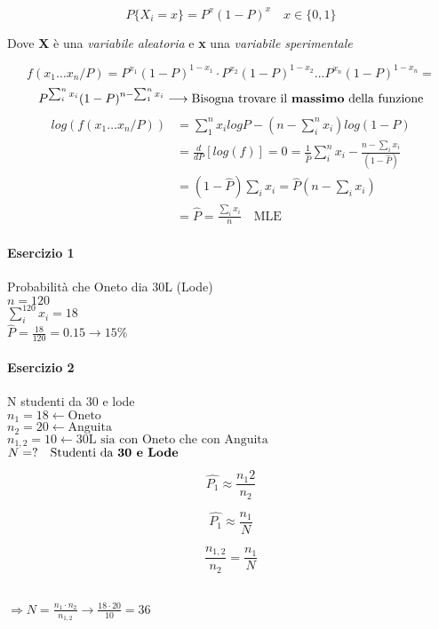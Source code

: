 \documentclass[]{article}
\begin{document}
    \[ P\{X_i = x\} = P^x (1-P)^x \quad x \in \{0, 1\} \]
    \centerline{Dove \textbf{X} è una \textit{variabile aleatoria} e \textbf{x} una \textit{variabile sperimentale} }
    \[ f(x_1 \ldots x_n / P) = P^{x_1} (1-P)^{1-x_1} \cdot P^{x_2} (1-P)^{1-x_2} \ldots P^{x_n} (1-P)^{1-x_n} = \]
    \[ P^{\sum_{i}^{n}x_i} (1-P)^{n - \sum_{1}^{n} x_i} \longrightarrow \text{Bisogna trovare il \textbf{massimo} della funzione} \]
    \begin{equation*}
        \begin{split}
            log(f(x_1 \ldots x_n / P)) &= \sum_{1}^{n} x_i log P - (n - \sum_{i}^{n} x_i) log(1-P) \\
            &= \frac{d}{dP}[log(f)] = 0 = \frac{1}{\hat{P}} \sum_{i}^{n} x_i - \frac{n - \sum_{i}^{} x_i }{(1-\hat{P})} \\
            &= (1- \hat{P}) \sum_{i}^{} x_i = \hat{P} (n - \sum_{i}^{} x_i) \\
            &= \hat{P} = \frac{\sum_{i}^{} x_i }{n} \quad \text{MLE}
        \end{split}
    \end{equation*}
    \paragraph{Esercizio 1} Probabilità che Oneto dia 30L (Lode) \\
    $n = 120$ \\
    $\sum_{i}^{120} x_i = 18$ \\
    $\hat{P} = \frac{18}{120} = 0.15 \rightarrow 15\%$ \\
    \paragraph{Esercizio 2} N studenti da 30 e lode \\
    $n_1 = 18 \leftarrow \text{Oneto}$ \\ 
    $n_2 = 20 \leftarrow \text{Anguita}$ \\
    $n_{1,2} = 10 \leftarrow \text{30L sia con Oneto che con Anguita}$ \\
    $N= ? \quad \text{Studenti da \textbf{30 e Lode}}$ \\
    \begin{minipage}{0.30\textwidth}
        \[ \hat{P_1} \approx \frac{n_1 2}{n_2} \]
    \end{minipage}
    \begin{minipage}{0.30\textwidth}
        \[ \hat{P_1} \approx \frac{n_1}{N} \]
    \end{minipage}
    \begin{minipage}{0.30\textwidth}
        \[ \frac{n_{1,2}}{n_2} = \frac{n_1}{N} \]
    \end{minipage} \\
    $ \Longrightarrow N= \frac{n_1 \cdot n_2}{n_{1,2}} \rightarrow \frac{18 \cdot 20}{10} = 36 $
\end{document}

